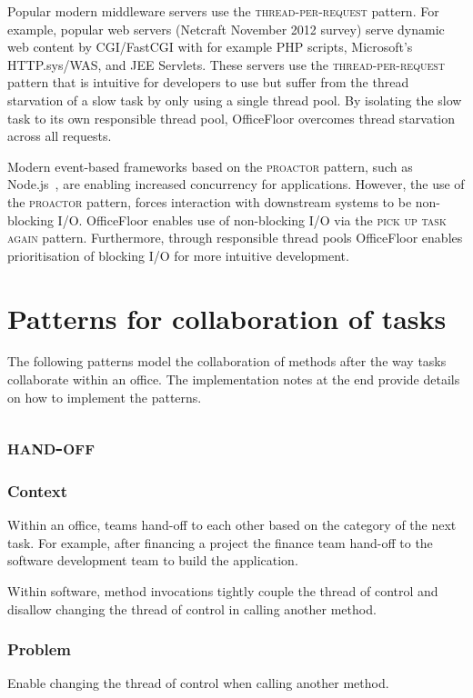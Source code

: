 \documentclass[prodmode]{style/acmlarge}
\begin{document}
Popular modern middleware servers use the \textsc{thread-per-request} pattern.
For example, popular web servers (Netcraft November 2012 survey) serve dynamic
web content by CGI/FastCGI with for example PHP scripts, Microsoft's
HTTP.sys/WAS, and JEE Servlets. These servers use the
\textsc{thread-per-request} pattern that is intuitive for developers to use but
suffer from the thread starvation of a slow task by only using a single thread
pool.  By isolating the slow task to its own responsible thread pool,
OfficeFloor overcomes thread starvation across all requests.

Modern event-based frameworks based on the \textsc{proactor} pattern, such as
Node.js~\cite{nodejs}, are enabling increased concurrency for applications.
However, the use of the \textsc{proactor} pattern, forces interaction with
downstream systems to be non-blocking I/O.  OfficeFloor enables use of
non-blocking I/O via the \textsc{pick up task again} pattern.  Furthermore,
through responsible thread pools OfficeFloor enables prioritisation of blocking
I/O for more intuitive development.


\section{Patterns for collaboration of tasks}

The following patterns model the collaboration of methods after the way tasks
collaborate within an office.  The implementation notes at the end provide
details on how to implement the patterns.


\subsection{\textsc{\textbf{hand-off}}}

\subsubsection*{Context} Within an office, teams hand-off to each other based on
the category of the next task.  For example, after financing a project the
finance team hand-off to the software development team to build the application.

Within software, method invocations tightly couple the thread of control and
disallow changing the thread of control in calling another method.

\subsubsection*{Problem} Enable changing the thread of control when calling
another method.
\end{document}
